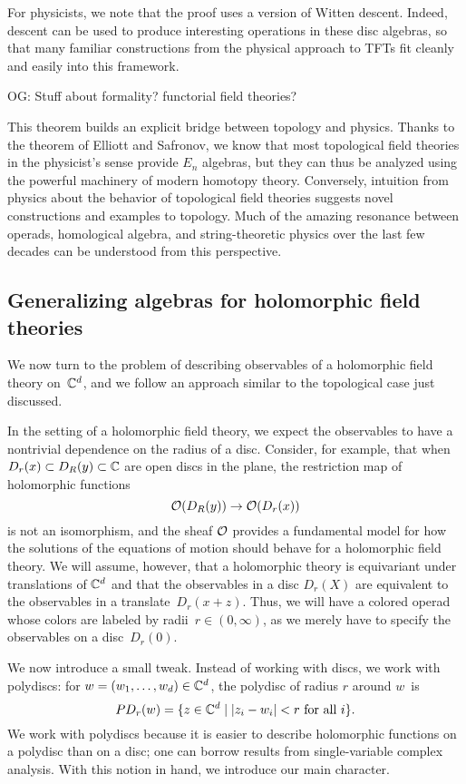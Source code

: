 \documentclass[11pt]{amsart}
\def\owen#1{{\textcolor{violet!65!black}{OG: {#1}}}}
\begin{document}
For physicists, we note that the proof uses a version of Witten descent.
Indeed, descent can be used to produce interesting operations in these disc algebras,
so that many familiar constructions from the physical approach to TFTs fit cleanly and easily into this framework.

\owen{Stuff about formality? functorial field theories?}

This theorem builds an explicit bridge between topology and physics. 
Thanks to the theorem of Elliott and Safronov, we know that most topological field theories in the physicist's sense provide $E_n$ algebras,
but they can thus be analyzed using the powerful machinery of modern homotopy theory. 
Conversely, intuition from physics about the behavior of topological field theories suggests novel constructions and examples to topology. 
Much of the amazing resonance between operads, homological algebra, and string-theoretic physics over the last few decades can be understood from this perspective.

\subsection{Generalizing algebras for holomorphic field theories}

We now turn to the problem of describing observables of a holomorphic field theory on~$\mathbb C^d$,
and we follow an approach similar to the topological case just discussed.

In the setting of a holomorphic field theory, we expect the observables to have a nontrivial dependence on the radius of a disc.
Consider, for example, that 
when $D_r(x) \subset D_R(y) \subset \mathbb C$ are open discs in the plane,
the restriction map of holomorphic functions
\[
\mathcal O(D_R(y))\to \mathcal O(D_r(x))
\]
is not an isomorphism,
and the sheaf $\mathcal O$ provides a fundamental model for how the solutions of the equations of motion should behave for a holomorphic field theory.
We will assume, however, that a holomorphic theory is equivariant under translations of $\mathbb C^d$ and that the observables in a disc $D_r(X)$ are equivalent to the observables in a translate~$D_r(x+z)$.
Thus, we will have a colored operad whose colors are labeled by radii~$r \in (0,\infty)$,
as we merely have to specify the observables on a disc~$D_r(0)$.

We now introduce a small tweak.
Instead of working with discs, we work with polydiscs: for $w = (w_1, \ldots, w_d) \in \mathbb C^d$, the polydisc of radius $r$ around $w$~is
\[
PD_r(w) = \{ z \in \mathbb C^d \;|\; |z_i - w_i| < r \text{ for all $i$}\}.
\]
We work with polydiscs because it is easier to describe holomorphic functions on a polydisc than on a disc;
one can borrow results from single-variable complex analysis.
With this notion in hand, we introduce our main character.
\end{document}

